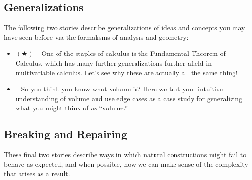 \documentclass[12pt]{article}
\begin{document}
%

\noindent {}

\subsection{Generalizations}
The following two stories describe generalizations of ideas and
concepts you may have seen before via the formalisms of analysis and geometry:  
\begin{itemize}
  \item $(\bigstar)$  -- One of the staples of calculus is the Fundamental
    Theorem of Calculus, which has many further generalizations further afield
    in multivariable calculus. Let's see why these are actually all the same
    thing! 

  \item {} -- So you
    think you know what volume is? Here we test your intuitive understanding of
    volume and use edge cases as a case study for generalizing what you might
    think of as ``volume.'' 
\end{itemize}

\subsection{Breaking and Repairing}
These final two stories describe ways in which natural constructions might fail
to behave as expected, and when possible, how we can make sense of the complexity
that arises as a result. 
\end{document}
